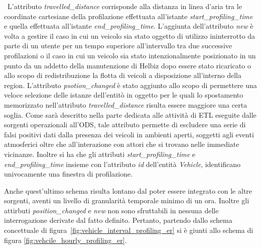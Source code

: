\noindent~L'attributo \textit{travelled\_distance} corrisponde alla distanza in linea
d'aria tra le coordinate cartesiane della profilazione effettuata all'istante
\textit{start\_profiling\_time} e quella effettuata all'istante
\textit{end\_profiling\_time}.
L'aggiunta dell'attributo \textit{new} è volta a gestire il caso in cui un
veicolo sia stato oggetto di utilizzo ininterrotto da parte di un utente per
un tempo superiore all'intervallo tra due successive profilazioni o il caso in
cui un veicolo sia stato intenzionalmente posizionato in un punto da un addetto
della manutenzione di Helbiz dopo essere stato ricaricato o allo scopo di
redistribuzione la flotta di veicoli a disposizione all'interno della region.
L'attributo \textit{psotion\_changed} è stato aggiunto allo scopo di permettere
una veloce selezione delle istanze dell'entitò in oggetto per le quali lo
spostamento memorizzato nell'attributo \textit{travelled\_distance} risulta essere
maggiore una certa soglia. Come sarà descritto nella parte dedicata alle attività di
ETL eseguite dalle sorgenti operazionali all'ODS, tale attributo permette di
escludere una serie di falsi positivi dati dalla presenza dei veicoli in ambienti
aperti, soggetti agli eventi atmosferici oltre che all'interazione con attori
che si trovano nelle immediate vicinanze.
Inoltre si ha che gli attributi \textit{start\_profiling\_time} e
\textit{end\_profiling\_time} insieme con l'attributo \textit{id} dell'entità
\textit{Vehicle}, identificano univocamente una finestra di profilazione.

Anche quest'ultimo schema risulta lontano dal poter essere integrato con le altre
sorgenti, aventi un livello di granularità temporale minimo di un ora.
Inoltre gli attirbuti \textit{position\_changed} e \textit{new} non sono
sfruttabili in nessuna delle interrogazione derivate dal fatto definito.
Pertanto, partendo dallo schema concettuale di
figura~\ref{fig:vehicle_interval_profiling_er} si è giunti allo schema di figura
\ref{fig:vehcile_hourly_profiling_er}.


